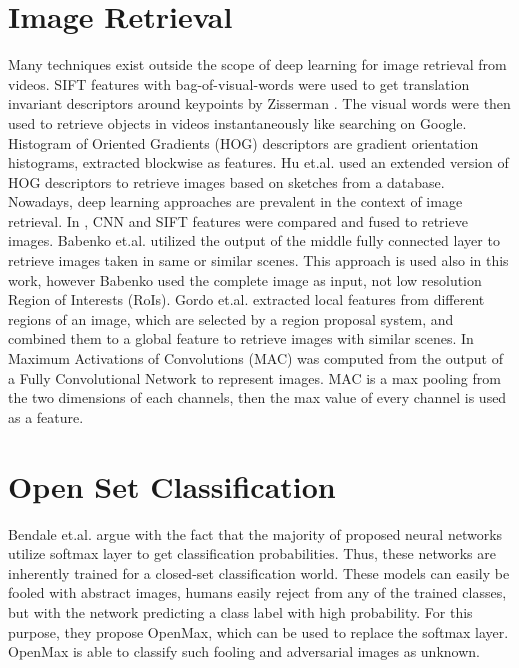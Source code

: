 \section{Image Retrieval}
Many techniques exist outside the scope of deep learning for image retrieval from videos. SIFT features \cite{Lowe:2004:DIF:993451.996342} with bag-of-visual-words were used to get translation invariant descriptors around keypoints by Zisserman \cite{Sivic:2003:VGT:946247.946751}. The visual words were then used to retrieve objects in videos instantaneously like searching on Google. Histogram of Oriented Gradients (HOG) \cite{Dalal:2005:HOG:1068507.1069007} descriptors are gradient orientation histograms, extracted blockwise as features. Hu et.al. \cite{Hu:2013:PEG:2479988.2480107} used an extended version of HOG descriptors to retrieve images based on sketches from a database. Nowadays, deep learning approaches are prevalent in the context of image retrieval. In \cite{Yan:2016:CVS:2964284.2967252}, CNN and SIFT features were compared and fused to retrieve images. Babenko et.al. \cite{DBLP:journals/corr/BabenkoSCL14} utilized the output of the middle fully connected layer to retrieve images taken in same or similar scenes. This approach is used also in this work, however Babenko used the complete image as input, not low resolution Region of Interests (RoIs). Gordo et.al. \cite{DBLP:journals/corr/GordoARL16} extracted local features from different regions of an image, which are selected by a region proposal system, and combined them to a global feature to retrieve images with similar scenes. In \cite{DBLP:journals/corr/RadenovicTC16} Maximum Activations of Convolutions (MAC) was computed from the output of a Fully Convolutional Network to represent images. MAC is a max pooling from the two dimensions of each channels, then the max value of every channel is used as a feature.
\section{Open Set Classification}
Bendale et.al. argue \cite{DBLP:journals/corr/BendaleB15} with the fact that the majority of proposed neural networks utilize softmax layer to get classification probabilities. Thus, these networks are inherently trained for a closed-set classification world. These models can easily be fooled with abstract images, humans easily reject from any of the trained classes, but with the network predicting a class label with high probability. For this purpose, they propose OpenMax, which can be used to replace the softmax layer. OpenMax is able to classify such fooling and adversarial images as unknown.
